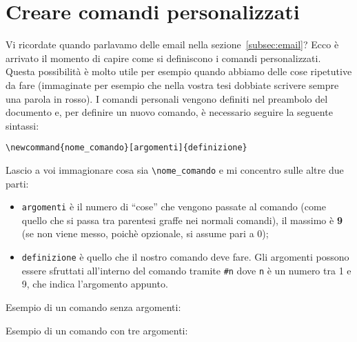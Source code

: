 \chapter{Creare comandi personalizzati}
Vi ricordate quando parlavamo delle email nella sezione~\ref{subsec:email}? 
Ecco è arrivato il momento di capire come si definiscono i comandi 
personalizzati. Questa possibilità è molto utile per esempio quando abbiamo 
delle cose ripetutive da fare (immaginate per esempio che nella vostra tesi 
dobbiate scrivere sempre una parola in rosso). I comandi personali vengono 
definiti nel preambolo del documento e, per definire un nuovo comando, è 
necessario seguire la seguente sintassi: \\
\begin{center}
    \verb!\newcommand{nome_comando}[argomenti]{definizione}!
\end{center}
Lascio a voi immagionare cosa sia \verb!\nome_comando! e mi concentro sulle 
altre due parti:
\begin{itemize}
    \item \verb!argomenti! è il numero di ``cose'' che vengono passate al 
    comando (come quello che si passa tra parentesi graffe nei normali 
    comandi), il massimo è \textbf{9} (se non viene messo, poichè opzionale, 
    si assume pari a 0);
    \item \verb!definizione! è quello che il nostro comando deve fare. Gli 
    argomenti possono essere sfruttati all'interno del comando tramite 
    \verb!#n! dove \verb!n! è un numero tra 1 e 9, che indica l'argomento 
    appunto.
\end{itemize}

Esempio di un comando senza argomenti:


Esempio di un comando con tre argomenti:
